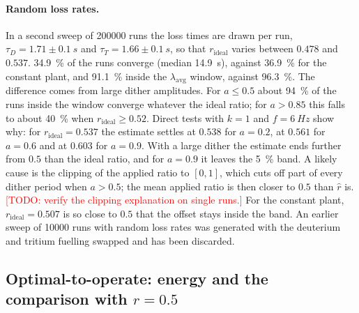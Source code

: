 \documentclass[11pt,a4paper]{article}
\newcommand{\todo}[1]{\textcolor{red}{[TODO: #1]}}
\newcommand{\rid}{r_\mathrm{ideal}}
\newcommand{\rhat}{\hat r}
\newcommand{\lavg}{\lambda_\mathrm{avg}}
\begin{document}
\paragraph{Random loss rates.} In a second sweep of \num{200000} runs the loss times are drawn per run, $\tau_D=1.71\pm\SI{0.1}{s}$ and $\tau_T=1.66\pm\SI{0.1}{s}$, so that $\rid$ varies between $0.478$ and $0.537$. \SI{34.9}{\percent} of the runs converge (median \SI{14.9}{s}), against \SI{36.9}{\percent} for the constant plant, and \SI{91.1}{\percent} inside the $\lavg$ window, against \SI{96.3}{\percent}. The difference comes from large dither amplitudes. For $a\le0.5$ about \SI{94}{\percent} of the runs inside the window converge whatever the ideal ratio; for $a>0.85$ this falls to about \SI{40}{\percent} when $\rid\ge0.52$. Direct tests with $k=1$ and $f=\SI{6}{Hz}$ show why: for $\rid=0.537$ the estimate settles at $0.538$ for $a=0.2$, at $0.561$ for $a=0.6$ and at $0.603$ for $a=0.9$. With a large dither the estimate ends further from $0.5$ than the ideal ratio, and for $a=0.9$ it leaves the \SI{5}{\percent} band. A likely cause is the clipping of the applied ratio to $[0,1]$, which cuts off part of every dither period when $a>0.5$; the mean applied ratio is then closer to $0.5$ than $\rhat$ is. \todo{verify the clipping explanation on single runs.} For the constant plant, $\rid=0.507$ is so close to $0.5$ that the offset stays inside the band.
An earlier sweep of \num{10000} runs with random loss rates was generated with the deuterium and tritium fuelling swapped and has been discarded.

\subsection{Optimal-to-operate: energy and the comparison with $r=0.5$}
\label{sec:oto}
\end{document}
